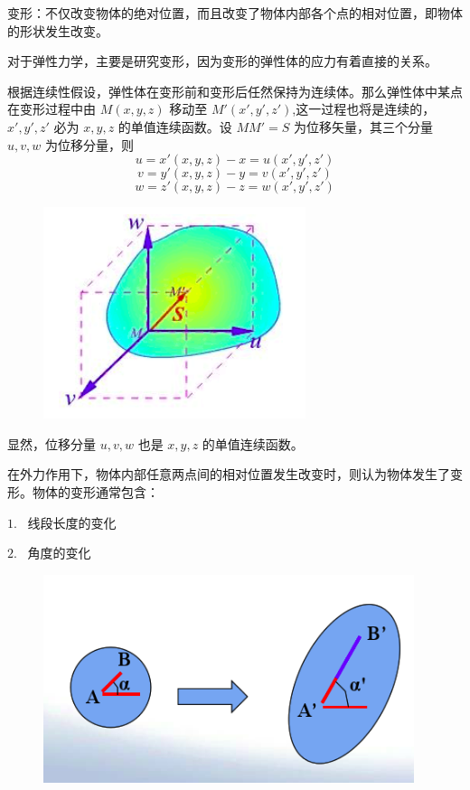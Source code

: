 \documentclass[12pt,a4paper]{article}
\begin{document}
变形：不仅改变物体的绝对位置，而且改变了物体内部各个点的相对位置，即物体的形状发生改变。

对于弹性力学，主要是研究变形，因为变形的弹性体的应力有着直接的关系。

根据连续性假设，弹性体在变形前和变形后任然保持为连续体。那么弹性体中某点在变形过程中由 $M(x,y,z)$ 移动至 $M'(x',y',z')$,这一过程也将是连续的，$x',y',z'$ 必为 $x,y,z$ 的单值连续函数。设 $MM'=S$ 为位移矢量，其三个分量 $u,v,w$ 为位移分量，则
$$
u=x'(x,y,z)-x=u(x',y',z')
$$
$$
v=y'(x,y,z)-y=v(x',y',z')
$$
$$
w=z'(x,y,z)-z=w(x',y',z')
$$

\begin{figure}[H]
\centering
\includegraphics[scale=0.5]{./figures/11.png}
\caption{}
\end{figure}

显然，位移分量 $u,v,w$ 也是 $x,y,z$ 的单值连续函数。

在外力作用下，物体内部任意两点间的相对位置发生改变时，则认为物体发生了变形。物体的变形通常包含：

$1$. ~线段长度的变化

$2$. ~角度的变化

\begin{figure}[H]
\centering
\includegraphics[scale=0.4]{./figures/23.png}
\caption{}
\end{figure}
\end{document}
